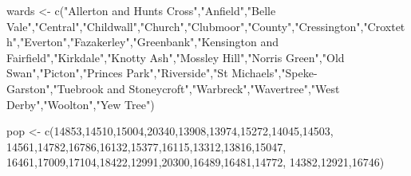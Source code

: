 \documentclass[
  letterpaper,
  DIV=11,
  numbers=noendperiod,
  oneside]{scrreprt}
\newenvironment{Shaded}{\begin{snugshade}}{\end{snugshade}}
\newcommand{\DecValTok}[1]{\textcolor[rgb]{0.68,0.00,0.00}{#1}}
\newcommand{\FunctionTok}[1]{\textcolor[rgb]{0.28,0.35,0.67}{#1}}
\newcommand{\NormalTok}[1]{\textcolor[rgb]{0.00,0.23,0.31}{#1}}
\newcommand{\OtherTok}[1]{\textcolor[rgb]{0.00,0.23,0.31}{#1}}
\newcommand{\StringTok}[1]{\textcolor[rgb]{0.13,0.47,0.30}{#1}}
\begin{document}
\begin{Shaded}
\begin{Highlighting}[]
\NormalTok{wards }\OtherTok{\textless{}{-}} \FunctionTok{c}\NormalTok{(}\StringTok{"Allerton and Hunts Cross"}\NormalTok{,}\StringTok{"Anfield"}\NormalTok{,}\StringTok{"Belle Vale"}\NormalTok{,}\StringTok{"Central"}\NormalTok{,}\StringTok{"Childwall"}\NormalTok{,}\StringTok{"Church"}\NormalTok{,}\StringTok{"Clubmoor"}\NormalTok{,}\StringTok{"County"}\NormalTok{,}\StringTok{"Cressington"}\NormalTok{,}\StringTok{"Croxteth"}\NormalTok{,}\StringTok{"Everton"}\NormalTok{,}\StringTok{"Fazakerley"}\NormalTok{,}\StringTok{"Greenbank"}\NormalTok{,}\StringTok{"Kensington and Fairfield"}\NormalTok{,}\StringTok{"Kirkdale"}\NormalTok{,}\StringTok{"Knotty Ash"}\NormalTok{,}\StringTok{"Mossley Hill"}\NormalTok{,}\StringTok{"Norris Green"}\NormalTok{,}\StringTok{"Old Swan"}\NormalTok{,}\StringTok{"Picton"}\NormalTok{,}\StringTok{"Princes Park"}\NormalTok{,}\StringTok{"Riverside"}\NormalTok{,}\StringTok{"St Michael\textquotesingle{}s"}\NormalTok{,}\StringTok{"Speke{-}Garston"}\NormalTok{,}\StringTok{"Tuebrook and Stoneycroft"}\NormalTok{,}\StringTok{"Warbreck"}\NormalTok{,}\StringTok{"Wavertree"}\NormalTok{,}\StringTok{"West Derby"}\NormalTok{,}\StringTok{"Woolton"}\NormalTok{,}\StringTok{"Yew Tree"}\NormalTok{)}

\NormalTok{pop }\OtherTok{\textless{}{-}} \FunctionTok{c}\NormalTok{(}\DecValTok{14853}\NormalTok{,}\DecValTok{14510}\NormalTok{,}\DecValTok{15004}\NormalTok{,}\DecValTok{20340}\NormalTok{,}\DecValTok{13908}\NormalTok{,}\DecValTok{13974}\NormalTok{,}\DecValTok{15272}\NormalTok{,}\DecValTok{14045}\NormalTok{,}\DecValTok{14503}\NormalTok{,}
                \DecValTok{14561}\NormalTok{,}\DecValTok{14782}\NormalTok{,}\DecValTok{16786}\NormalTok{,}\DecValTok{16132}\NormalTok{,}\DecValTok{15377}\NormalTok{,}\DecValTok{16115}\NormalTok{,}\DecValTok{13312}\NormalTok{,}\DecValTok{13816}\NormalTok{,}\DecValTok{15047}\NormalTok{,}
                \DecValTok{16461}\NormalTok{,}\DecValTok{17009}\NormalTok{,}\DecValTok{17104}\NormalTok{,}\DecValTok{18422}\NormalTok{,}\DecValTok{12991}\NormalTok{,}\DecValTok{20300}\NormalTok{,}\DecValTok{16489}\NormalTok{,}\DecValTok{16481}\NormalTok{,}\DecValTok{14772}\NormalTok{,}
                \DecValTok{14382}\NormalTok{,}\DecValTok{12921}\NormalTok{,}\DecValTok{16746}\NormalTok{)}


\end{Highlighting}
\end{Shaded}
\end{document}
